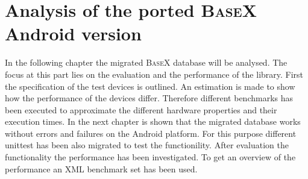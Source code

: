 \chapter{Analysis of the ported \textsc{BaseX} Android version}
\label{cha:analysis}
In the following chapter the migrated \textsc{BaseX} database will be analysed.
The focus at this part lies on the evaluation and the performance of the library.
First the specification of the test devices is outlined.
An estimation is made to show how the performance of the devices differ.
Therefore different benchmarks has been executed to approximate the different hardware properties and their execution times.
In the next chapter is shown that the migrated database works without errors and failures on the Android platform.
For this purpose different unittest has been also migrated to test the functionility.
After evaluation the functionality the performance has been investigated.
To get an overview of the performance an XML benchmark set has been used.
